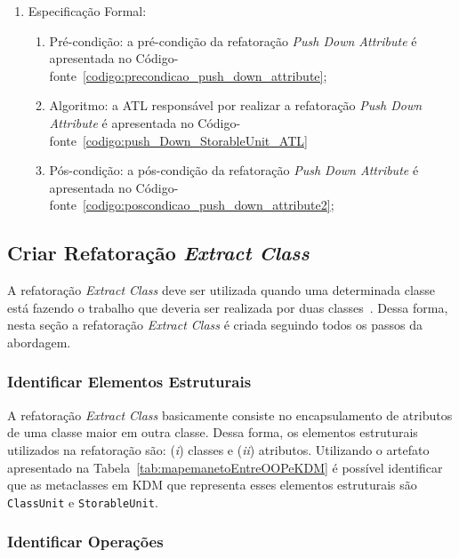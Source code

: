 \begin{enumerate}
\begin{enumerate}
\begin{itemize}
			    \end{itemize} 
	    \end{enumerate}
		\item Especificação Formal:
		\begin{enumerate}
			\item Pré-condição: a pré-condição da refatoração \textit{Push Down Attribute} é apresentada no Código-fonte~\ref{codigo:precondicao_push_down_attribute};
			\item Algoritmo: a ATL responsável por realizar a refatoração \textit{Push Down Attribute} é apresentada no Código-fonte~\ref{codigo:push_Down_StorableUnit_ATL}
			\item Pós-condição: a pós-condição da refatoração \textit{Push Down Attribute} é apresentada no Código-fonte~\ref{codigo:poscondicao_push_down_attribute2};
		\end{enumerate}
	\end{enumerate}		
	
	
	
\subsection{Criar Refatoração \textit{Extract Class}}
A refatoração \textit{Extract Class} deve ser utilizada quando uma determinada classe está fazendo o trabalho que deveria ser realizada por duas classes~\cite{Fowler1999}. Dessa forma, nesta seção a refatoração \textit{Extract Class} é criada seguindo todos os passos da abordagem. 

\subsubsection{Identificar Elementos Estruturais}

A refatoração \textit{Extract Class} basicamente consiste no encapsulamento de atributos de uma classe maior em outra classe. Dessa forma, os elementos estruturais utilizados na refatoração são: (\textit{i}) classes e (\textit{ii}) atributos. Utilizando o artefato apresentado na Tabela~\ref{tab:mapemanetoEntreOOPeKDM} é possível identificar que as metaclasses em KDM que representa esses elementos estruturais são \texttt{ClassUnit} e \texttt{StorableUnit}.

\subsubsection{Identificar Operações}

